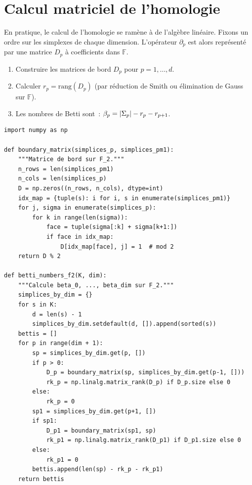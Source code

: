 \section{Calcul matriciel de l'homologie}

En pratique, le calcul de l'homologie se ram\`ene \`a de l'alg\`ebre
lin\'eaire. Fixons un ordre sur les simplexes de chaque dimension.
L'op\'erateur $\partial_p$ est alors repr\'esent\'e par une matrice
$D_p$ \`a coefficients dans $\mathbb{F}$.

\begin{algorithme}[title=\textbf{Calcul des nombres de Betti}]
\begin{enumerate}
  \item Construire les matrices de bord $D_p$ pour $p = 1, \ldots, d$.
  \item Calculer $r_p = \mathrm{rang}(D_p)$ (par r\'eduction de Smith
        ou \'elimination de Gauss sur $\mathbb{F}$).
  \item Les nombres de Betti sont~:
        $\beta_p = \left| \Sigma_p \right| - r_p - r_{p+1}$.
\end{enumerate}
\end{algorithme}

\begin{codeblock}[title=\textbf{Calcul de l'homologie avec des matrices}]
\begin{verbatim}
import numpy as np

def boundary_matrix(simplices_p, simplices_pm1):
    """Matrice de bord sur F_2."""
    n_rows = len(simplices_pm1)
    n_cols = len(simplices_p)
    D = np.zeros((n_rows, n_cols), dtype=int)
    idx_map = {tuple(s): i for i, s in enumerate(simplices_pm1)}
    for j, sigma in enumerate(simplices_p):
        for k in range(len(sigma)):
            face = tuple(sigma[:k] + sigma[k+1:])
            if face in idx_map:
                D[idx_map[face], j] = 1  # mod 2
    return D % 2

def betti_numbers_f2(K, dim):
    """Calcule beta_0, ..., beta_dim sur F_2."""
    simplices_by_dim = {}
    for s in K:
        d = len(s) - 1
        simplices_by_dim.setdefault(d, []).append(sorted(s))
    bettis = []
    for p in range(dim + 1):
        sp = simplices_by_dim.get(p, [])
        if p > 0:
            D_p = boundary_matrix(sp, simplices_by_dim.get(p-1, []))
            rk_p = np.linalg.matrix_rank(D_p) if D_p.size else 0
        else:
            rk_p = 0
        sp1 = simplices_by_dim.get(p+1, [])
        if sp1:
            D_p1 = boundary_matrix(sp1, sp)
            rk_p1 = np.linalg.matrix_rank(D_p1) if D_p1.size else 0
        else:
            rk_p1 = 0
        bettis.append(len(sp) - rk_p - rk_p1)
    return bettis
\end{verbatim}
\end{codeblock}

